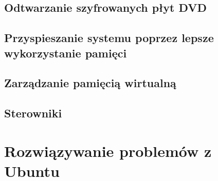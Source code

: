 \documentclass[a4paper,11pt,oneside]{mwart}
\begin{document}
		\subsection{Odtwarzanie szyfrowanych płyt DVD}
			
		\subsection{Przyspieszanie systemu poprzez lepsze wykorzystanie pamięci}
		\subsection{Zarządzanie pamięcią wirtualną}
		\subsection{Sterowniki} 
	\section{Rozwiązywanie problemów z Ubuntu}
\end{document}
